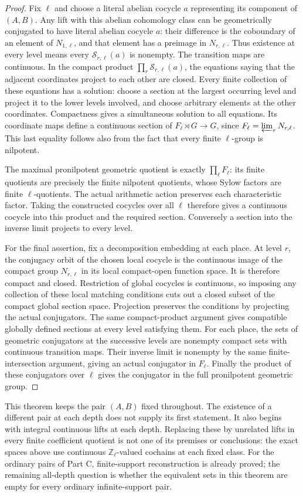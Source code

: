 \begin{proof}
Fix \(\ell\) and choose a literal abelian cocycle \(a\)
representing its component of \((A,B)\). Any lift with this
abelian cohomology class can be geometrically conjugated to
have literal abelian cocycle \(a\): their difference is the
coboundary of an element of \(N_{1,\ell}\), and that element
has a preimage in \(N_{r,\ell}\). Thus existence at every
level means every \(\mathscr S_{r,\ell}(a)\) is nonempty.
The transition maps are continuous. In the compact product
\(\prod_r\mathscr S_{r,\ell}(a)\), the equations saying that
the adjacent coordinates project to each other are closed.
Every finite collection of these equations has a solution:
choose a section at the largest occurring level and project it
to the lower levels involved, and choose arbitrary elements at
the other coordinates. Compactness gives a simultaneous
solution to all equations. Its coordinate maps define a
continuous section of \(F_\ell\rtimes G\to G\), since
\(F_\ell=\varprojlim_rN_{r,\ell}\). This last equality follows
also from the fact that every finite \(\ell\)-group is nilpotent.

The maximal pronilpotent geometric quotient is exactly
\(\prod_\ell F_\ell\): its finite quotients are precisely the
finite nilpotent quotients, whose Sylow factors are finite
\(\ell\)-quotients. The actual arithmetic action preserves
each characteristic factor. Taking the constructed cocycles
over all \(\ell\) therefore gives a continuous cocycle into
this product and the required section. Conversely a section
into the inverse limit projects to every level.

For the final assertion, fix a decomposition embedding at each
place. At level \(r\), the conjugacy orbit of the chosen local
cocycle is the continuous image of the compact group
\(N_{r,\ell}\) in its local compact-open function space. It is
therefore compact and closed. Restriction of global cocycles
is continuous, so imposing any collection of these local
matching conditions cuts out a closed subset of the compact
global section space. Projection preserves the conditions by
projecting the actual conjugators. The same compact-product
argument gives compatible globally defined sections at every
level satisfying them. For each place, the sets of geometric
conjugators at the successive levels are nonempty compact
sets with continuous transition maps. Their inverse limit is
nonempty by the same finite-intersection argument, giving an
actual conjugator in \(F_\ell\). Finally the product of these
conjugators over \(\ell\) gives the conjugator in the full
pronilpotent geometric group.
\end{proof}

This theorem keeps the pair \((A,B)\) fixed throughout. The
existence of a different pair at each depth does not supply its
first statement. It also begins with integral continuous lifts
at each depth. Replacing these by unrelated lifts in every
finite coefficient quotient is not one of its premises or
conclusions: the exact spaces above use continuous
\(\mathbb Z_\ell\)-valued cochains at each fixed class.
For the ordinary pairs of Part C, finite-support reconstruction
is already proved; the remaining all-depth question is whether
the equivalent sets in this theorem are empty for every
ordinary infinite-support pair.
